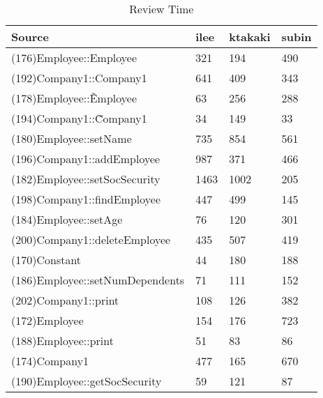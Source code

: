 \begin{table}[hb]
\begin{center}
\begin{tabular}{|l|l|l|l|}
\hline
Source & ilee & ktakaki & subin\\
\hline
(176)Employee::Employee & 321 & 194 & 490\\
(192)Company1::Company1 & 641 & 409 & 343\\
(178)Employee::\~Employee & 63 & 256 & 288\\
(194)Company1::\~Company1 & 34 & 149 & 33\\
(180)Employee::setName & 735 & 854 & 561\\
(196)Company1::addEmployee & 987 & 371 & 466\\
(182)Employee::setSocSecurity & 1463 & 1002 & 205\\
(198)Company1::findEmployee & 447 & 499 & 145\\
(184)Employee::setAge & 76 & 120 & 301\\
(200)Company1::deleteEmployee & 435 & 507 & 419\\
(170)Constant & 44 & 180 & 188\\
(186)Employee::setNumDependents & 71 & 111 & 152\\
(202)Company1::print & 108 & 126 & 382\\
(172)Employee & 154 & 176 & 723\\
(188)Employee::print & 51 & 83 & 86\\
(174)Company1 & 477 & 165 & 670\\
(190)Employee::getSocSecurity & 59 & 121 & 87\\
\hline
\end{tabular}
\end{center}
\caption{Review Time}
\end{table}


